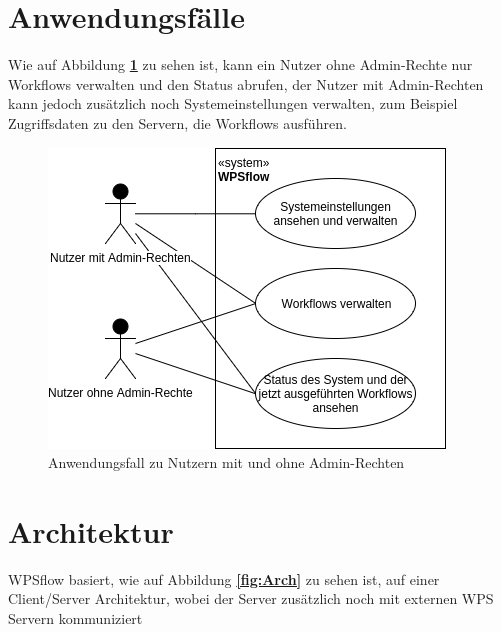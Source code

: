     \section{Anwendungsfälle}
    
    Wie auf Abbildung \textbf{\ref{fig:AWF}} zu sehen ist, kann ein Nutzer ohne Admin-Rechte nur Workflows verwalten und den Status abrufen, der Nutzer mit Admin-Rechten kann jedoch zusätzlich noch Systemeinstellungen verwalten, zum Beispiel Zugriffsdaten zu den Servern, die \Gls{Workflow}s ausführen.
    
    \begin{figure}[h]
        \centering
        \includegraphics[width=\textwidth]{images/Anwendungsfall1.png}
        \caption{Anwendungsfall zu Nutzern mit und ohne Admin-Rechten}
        \label{fig:AWF}
    \end{figure}
    

    
    
    
    \newpage
    \section{Architektur}

    WPSflow basiert, wie auf Abbildung \textbf{\ref{fig:Arch}} zu sehen ist, auf einer Client/Server Architektur, wobei der Server zusätzlich noch mit externen WPS Servern kommuniziert\newline
    
